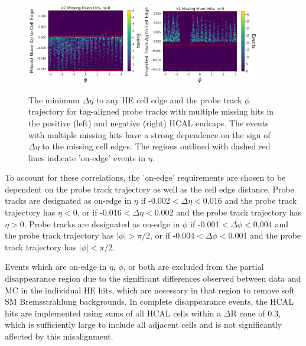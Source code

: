 \begin{figure}[htpb]
    \includegraphics[width=0.45\textwidth]{figures/posEtaEdgeEventsData.png} 
    \hspace{0.01\textwidth}
    \includegraphics[width=0.45\textwidth]{figures/negEtaEdgeEventsData.png}
    \centering
	\caption[$\eta$ edge correlations in missing HCAL muon hits.]{The minimum $\Delta\eta$ to any HE cell edge and the probe track $\phi$ trajectory for tag-aligned probe tracks with multiple missing hits in the positive (left) and negative (right) HCAL endcaps. The events with multiple missing hits have a strong dependence on the sign of $\Delta\eta$ to the missing cell edges. The regions outlined with dashed red lines indicate 'on-edge' events in $\eta$.}
    \label{fig:etaEdgeCorr}
\end{figure}

To account for these correlations, the 'on-edge' requirements are chosen to be dependent on the probe track trajectory as well as the cell edge distance. 
Probe tracks are designated as on-edge in $\eta$ if -0.002$<\Delta\eta<$0.016 and the probe track trajectory has $\eta<0$, or if -0.016$<\Delta\eta<$0.002 and the probe track trajectory
has $\eta>0$.
Probe tracks are designated as on-edge in $\phi$ if -0.001$<\Delta\phi<$0.004 and the probe track trajectory has $|\phi|>\pi/$2, or if -0.004$<\Delta\phi<$0.001 and the probe track trajectory has $|\phi|<\pi/$2.

Events which are on-edge in $\eta$, $\phi$, or both are excluded from the partial disappearance region due to the significant differences observed between data and MC in the individual HE hits, which are necessary in that region to remove soft SM Bremsstrahlung backgrounds.
In complete disappearance events, the HCAL hits are implemented using sums of all HCAL cells within a $\Delta$R cone of 0.3, which is sufficiently large to include all adjacent cells and is not significantly affected by this misalignment.

